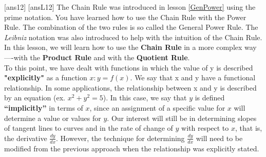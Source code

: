 
\newpage
[ans12]
[ansL12]
\noindent The Chain Rule was introduced in lesson \ref{GenPower} using the prime notation. You have learned how to use the Chain Rule with the Power Rule. The combination of the two rules is so called the General Power Rule. The \emph{Leibniz} notation was also introduced to help with the intuition of the Chain Rule. In this lesson, we will learn how to use the \textbf{Chain Rule} in a more complex way----with the \textbf{Product Rule} and with the \textbf{Quotient Rule}.\\
\newline
\noindent To this point, we have dealt with functions in which the value of y is described \textbf{"explicitly"} as a function $x: y=f(x)$.  We say that x and y have a functional relationship.  In some applications, the relationship between x and y is described by an equation (ex. $x^2+y^2=5$).  In this case, we say that $y$ is defined \textbf{“implicitly”} in terms of $x$, since an assignment of a specific value for $x$ will determine a value or values for $y$. Our interest will still be in determining slopes of tangent lines to curves and in the rate of change of $y$ with respect to $x$, that is, the derivative $\displaystyle\frac{dy}{dx}$.  However, the technique for determining $\displaystyle\frac{dy}{dx}$ will need to be modified from the previous approach when the relationship was explicitly stated. \\
\newline
